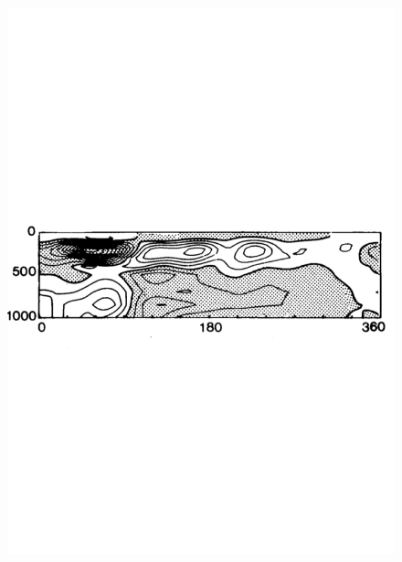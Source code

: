 \begin{figure}
\centering
\includegraphics[width = .7 \textwidth]{figs/GD/Heat5.png}
\caption{}
\end{figure}
